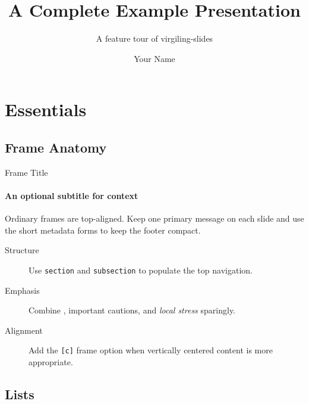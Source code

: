 \documentclass[10pt,aspectratio=169]{virgiling-slides}
\title[Presentation Title]{A Complete Example Presentation}
\subtitle{A feature tour of virgiling-slides}
\author[Your Name]{Your Name}
\institute[Your Institution]{Your Department or Research Group\\Your Institution}
\begin{document}
\VirgilingTitleFrame

\begingroup
  \setcounter{tocdepth}{1}
\endgroup

\section{Essentials}

\subsection{Frame Anatomy}

\begin{frame}{Frame Title}
  \framesubtitle{An optional subtitle for context}

  Ordinary frames are top-aligned. Keep one primary message on each slide and
  use the short metadata forms to keep the footer compact.

  \bigskip
  \begin{description}
    \item[Structure] Use \texttt{section} and \texttt{subsection} to populate the top navigation.
    \item[Emphasis] Combine , \alert{important cautions}, and \emph{local stress} sparingly.
    \item[Alignment] Add the \texttt{[c]} frame option when vertically centered content is more appropriate.
  \end{description}

\end{frame}

\subsection{Lists}
\end{document}
